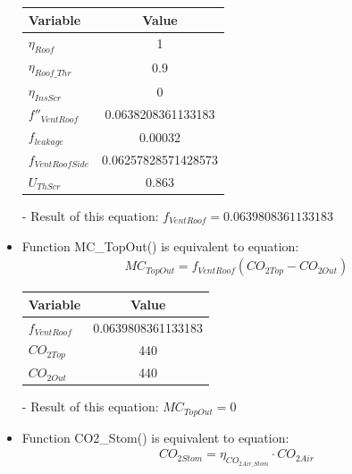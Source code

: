 \documentclass[a4paper]{article}
\numberwithin{equation}{section}
\begin{document}
\begin{itemize}
        \begin{table}[H]
          \centering
          \begin{tabular}{@{}lS[table-format=1.17]@{}}
            \toprule
            \textbf{Variable}    & \textbf{Value}      \\
            \midrule
            \(\eta_{Roof}\)      & 1                   \\
            \(\eta_{Roof\_Thr}\) & 0.9                 \\
            \(\eta_{InsScr}\)    & 0                   \\
            \(f''_{VentRoof}\)   & 0.0638208361133183  \\
            \(f_{leakage}\)      & 0.00032             \\
            \(f_{VentRoofSide}\) & 0.06257828571428573 \\
            \(U_{ThScr}\)        & 0.863               \\
            \bottomrule
          \end{tabular}
        \end{table}

  \item[-] Result of this equation: \(f_{VentRoof} = 0.0639808361133183\)

  \item Function MC\_TopOut() is equivalent to equation:
        \begin{align*}
          MC_{TopOut} = f_{VentRoof}(CO_{2 Top} - CO_{2 Out})
        \end{align*}

        \begin{table}[H]
          \centering
          \begin{tabular}{@{}lS@{}}
            \toprule
            \textbf{Variable} & \textbf{Value}     \\
            \midrule
            \(f_{VentRoof}\)  & 0.0639808361133183 \\
            \(CO_{2 Top}\)    & 440                \\
            \(CO_{2 Out}\)    & 440                \\
            \bottomrule
          \end{tabular}
        \end{table}

  \item[-] Result of this equation: \( MC_{TopOut} = 0 \)

  \item Function CO2\_Stom() is equivalent to equation:
        \begin{align*}
          CO_{2Stom} = \eta_{CO_{2Air\_Stom}} \cdot CO_{2Air}
        \end{align*}


\end{itemize}
\end{document}
